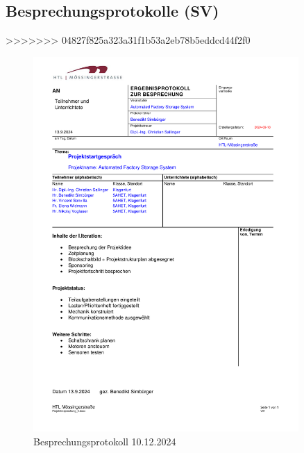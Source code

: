 \subsection{Besprechungsprotokolle (SV)}
>>>>>>> 04827f825a323a31f1b53a2eb78b5eddcd44f2f0
\begin{figure}[H]
    \includegraphics[width=0.9\textwidth]{../Protokolls/Projektbesprechung_0.pdf}
    \centering
    \caption{Besprechungsprotokoll 10.12.2024}
\end{figure}

